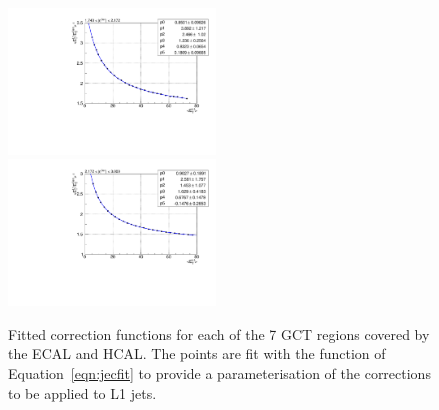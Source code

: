 \begin{figure}
\begin{center}
\includegraphics[width=0.49\textwidth]{detector/l1jet/egcor5.pdf}\\
\includegraphics[width=0.49\textwidth]{detector/l1jet/egcor6.pdf}
\end{center}
\caption{Fitted correction functions for each of the 7 GCT regions covered
by the ECAL and HCAL. 
The points are fit with the function of Equation~\ref{eqn:jecfit}  to 
provide a parameterisation of the corrections to be applied to L1 jets.}
\label{fig:allcorrfuncsp1}
\end{figure}

